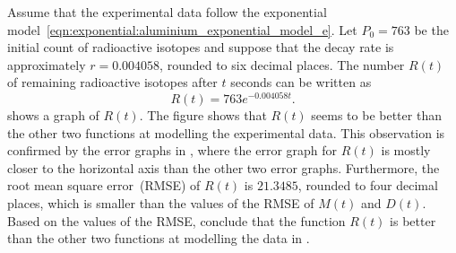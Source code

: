 \documentclass[a4paper,oneside,12pt]{article}
\begin{document}
\begin{problem}
{\begin{solution}
Assume that the experimental data follow the exponential
model~\eqref{eqn:exponential:aluminium_exponential_model_e}.  Let
$P_0 = 763$ be the initial count of radioactive isotopes and suppose
that the decay rate is approximately $r = 0.004058$, rounded to six
decimal places.  The number $R(t)$ of remaining radioactive isotopes
after $t$ seconds can be written as
\begin{equation}
\label{eqn:exponential:aluminium_mean_decay_rate}
R(t)
=
763 e^{-0.004058 t}.
\end{equation}
 shows a graph of
$R(t)$.  The figure shows that $R(t)$ seems to be better than the
other two functions at modelling the experimental data.  This
observation is confirmed by the error graphs in
, where the error
graph for $R(t)$ is mostly closer to the horizontal axis than the
other two error graphs.  Furthermore, the root mean square
error~(RMSE) of $R(t)$ is $21.3485$, rounded to four decimal places,
which is smaller than the values of the RMSE of $M(t)$ and $D(t)$.
Based on the values of the RMSE, conclude that the function $R(t)$ is
better than the other two functions at modelling the data in
.
\end{solution}
}{}

\begin{table}[!htbp]
\centering

\caption{%
  The vapour pressure of water as temperature increases.  Temperature
  is measured in degrees Celsius~($\degreec{}$) and the vapour
  pressure of water is measured in millimetre of mercury~(mm Hg).  The
  given vapour pressures cover only the case where water is in contact
  with its own vapour.  Data are taken from the following book:
  J.~G.~Speight~(editor). \emph{Lange's Handbook of Chemistry}. 16-th
  edition, McGraw-Hill, 2005, pp.1.224--1.225.
}
\label{tab:exponential:water_vapour_pressure}
\end{table}


\end{problem}
\end{document}
